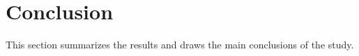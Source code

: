 \section{Conclusion}
\label{sec:Conclusion}

This section summarizes the results and draws the main conclusions of the study.